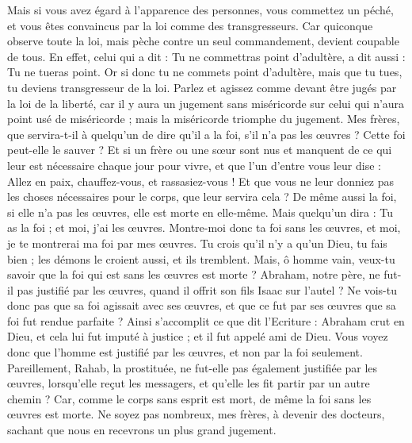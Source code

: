 \begin{multicols}{2}
Mais si vous avez égard à l'apparence des personnes, vous commettez un péché, et vous êtes convaincus par la loi comme des transgresseurs.
Car quiconque observe toute la loi, mais pèche contre un seul commandement, devient coupable de tous.
En effet, celui qui a dit : Tu ne commettras point d'adultère, a dit aussi : Tu ne tueras point. Or si donc tu ne commets point d'adultère, mais que tu tues, tu deviens transgresseur de la loi.
Parlez et agissez comme devant être jugés par la loi de la liberté,
car il y aura un jugement sans miséricorde sur celui qui n'aura point usé de miséricorde ; mais la miséricorde triomphe du jugement.
Mes frères, que servira-t-il à quelqu'un de dire qu'il a la foi, s'il n'a pas les œuvres ? Cette foi peut-elle le sauver ?
Et si un frère ou une sœur sont nus et manquent de ce qui leur est nécessaire chaque jour pour vivre,
et que l'un d'entre vous leur dise : Allez en paix, chauffez-vous, et rassasiez-vous ! Et que vous ne leur donniez pas les choses nécessaires pour le corps, que leur servira cela ?
De même aussi la foi, si elle n'a pas les œuvres, elle est morte en elle-même.
Mais quelqu'un dira : Tu as la foi ; et moi, j'ai les œuvres. Montre-moi donc ta foi sans les œuvres, et moi, je te montrerai ma foi par mes œuvres.
Tu crois qu'il n'y a qu'un Dieu, tu fais bien ; les démons le croient aussi, et ils tremblent.
Mais, ô homme vain, veux-tu savoir que la foi qui est sans les œuvres est morte ?
Abraham, notre père, ne fut-il pas justifié par les œuvres, quand il offrit son fils Isaac sur l'autel ?
Ne vois-tu donc pas que sa foi agissait avec ses œuvres, et que ce fut par ses œuvres que sa foi fut rendue parfaite ?
Ainsi s'accomplit ce que dit l'Ecriture : Abraham crut en Dieu, et cela lui fut imputé à justice ; et il fut appelé ami de Dieu.
Vous voyez donc que l'homme est justifié par les œuvres, et non par la foi seulement.
Pareillement, Rahab, la prostituée, ne fut-elle pas également justifiée par les œuvres, lorsqu'elle reçut les messagers, et qu'elle les fit partir par un autre chemin ?
Car, comme le corps sans esprit est mort, de même la foi sans les œuvres est morte.
\VerseOne{}Ne soyez pas nombreux, mes frères, à devenir des docteurs, sachant que nous en recevrons un plus grand jugement.

\end{multicols}
